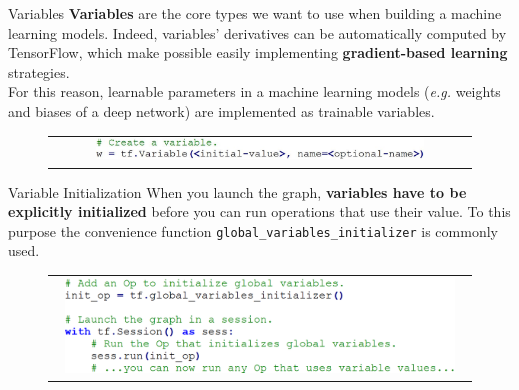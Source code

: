 \documentclass[aspectratio=169]{beamer}
\begin{document}
\begin{frame}{Variables}
\textbf{Variables} are the core types we want to use when building a machine learning models. Indeed, variables' derivatives can be automatically computed by TensorFlow, which make possible easily implementing \textbf{gradient-based learning} strategies.\\
\vspace{0.5cm}
For this reason, learnable parameters in a machine learning models (\textit{e.g.} weights and biases of a deep network) are implemented as trainable variables.
\begin{figure}
\begin{tabular}{c}
\includegraphics[width=0.8\textwidth]{img/tf/variable_creation.jpg}
\end{tabular}
\end{figure}
\end{frame}


\begin{frame}{Variable Initialization}
When you launch the graph, \textbf{variables have to be explicitly initialized} before you can run operations that use their value. To this purpose the convenience function \texttt{global\_variables\_initializer} is commonly used.
\begin{figure}
\begin{tabular}{c}
\includegraphics[width=0.95\textwidth]{img/tf/variable_initialization.png}
\end{tabular}
\end{figure}
\end{frame}

\end{document}

